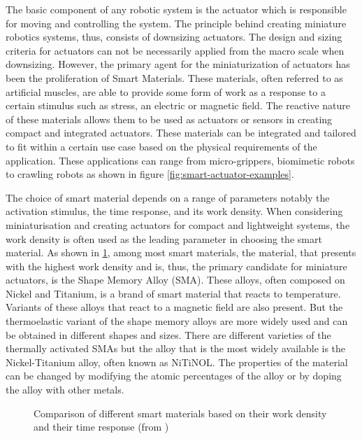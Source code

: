 The basic component of any robotic system is the actuator which is responsible for moving and controlling the system. The principle behind creating miniature robotics systems, thus, consists of downsizing actuators. The design and sizing criteria for actuators can not be necessarily applied from the macro scale when downsizing. However, the primary agent for the miniaturization of actuators has been the proliferation of Smart Materials. These materials, often referred to as artificial muscles, are able to provide some form of work as a response to a certain stimulus such as stress, an electric or magnetic field. The reactive nature of these materials allows them to be used as actuators or sensors in creating compact and integrated actuators. These materials can be integrated and tailored to fit within a certain use case based on the physical requirements of the application. These applications can range from micro-grippers, biomimetic robots to crawling robots as shown in figure \cref{fig:smart-actuator-examples}.

The choice of smart material depends on a range of parameters notably the activation stimulus, the time response, and its work density. When considering miniaturisation and creating actuators for compact and lightweight systems, the work density is often used as the leading parameter in choosing the smart material. As shown in \cref{fig:smart-material-comparison}, among most smart materials, the material, that presents with the highest work density and is, thus, the primary candidate for miniature actuators, is the Shape Memory Alloy (SMA). These alloys, often composed on Nickel and Titanium, is a brand of smart material that reacts to temperature. Variants of these alloys that react to a magnetic field are also present. But the thermoelastic variant of the shape memory alloys are more widely used and can be obtained in different shapes and sizes. There are different varieties of the thermally activated SMAs but the alloy that is the most widely available is the Nickel-Titanium alloy, often known as NiTiNOL. The properties of the material can be changed by modifying the atomic percentages of the alloy or by doping the alloy with other metals.

\begin{figure}[ht] %
  \centering
  \resizebox{0.8\textwidth}{!}{}
  \caption{Comparison of different smart materials based on their work density and their time response (from \cite{preumontMechatronicsDynamicsElectromechanical20064})}
  \label{fig:smart-material-comparison}
\end{figure}

